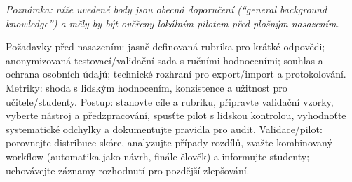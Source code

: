 \noindent\textit{Poznámka: níže uvedené body jsou obecná doporučení (``general background knowledge'') a měly by být ověřeny lokálním pilotem před plošným nasazením.}

\medskip

Požadavky před nasazením: jasně definovaná rubrika pro krátké odpovědi; anonymizovaná testovací/validační sada s ručními hodnoceními; souhlas a ochrana osobních údajů; technické rozhraní pro export/import a protokolování. Metriky: shoda s lidským hodnocením, konzistence a užitnost pro učitele/studenty. Postup: stanovte cíle a rubriku, připravte validační vzorky, vyberte nástroj a předzpracování, spusťte pilot s lidskou kontrolou, vyhodnoťte systematické odchylky a dokumentujte pravidla pro audit. Validace/pilot: porovnejte distribuce skóre, analyzujte případy rozdílů, zvažte kombinovaný workflow (automatika jako návrh, finále člověk) a informujte studenty; uchovávejte záznamy rozhodnutí pro pozdější zlepšování.